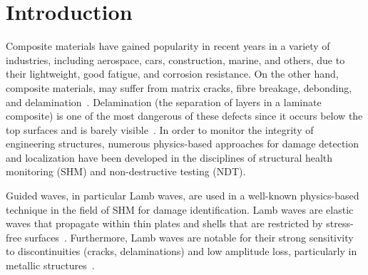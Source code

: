 \documentclass[runningheads]{llncs}
\begin{document}
\section{Introduction}
Composite materials have gained popularity in recent years in a variety of industries, including aerospace, cars, construction, marine, and others, due to their lightweight, good fatigue, and corrosion resistance.
On the other hand, composite materials, may suffer from matrix cracks, fibre breakage, debonding, and delamination~\cite{ip2004delamination}.
Delamination (the separation of layers in a laminate composite) is one of the most dangerous of these defects since it occurs below the top surfaces and is barely visible~\cite{Cai2012}.
%
In order to monitor the integrity of engineering structures, numerous physics-based approaches for damage detection and localization have been developed in the disciplines of structural health monitoring (SHM) and non-destructive testing (NDT).

Guided waves, in particular Lamb waves, are used in a well-known physics-based technique in the field of SHM for damage identification.
Lamb waves are elastic waves that propagate within thin plates and shells that are restricted by stress-free surfaces~\cite{mitra2016guided}.
Furthermore, Lamb waves are notable for their strong sensitivity to discontinuities (cracks, delaminations) and low amplitude loss, particularly in metallic structures~\cite{Keulen2014}.
\end{document}
